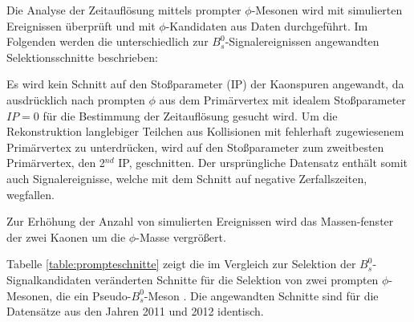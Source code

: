 \documentclass{article}
\begin{document}
Die Analyse der Zeitauflösung mittels prompter $\phi$-Mesonen wird mit simulierten Ereignissen überprüft und mit $\phi$-Kandidaten aus Daten durchgeführt. Im Folgenden werden die unterschiedlich zur $B_s^0$-Signalereignissen angewandten Selektionsschnitte beschrieben:

Es wird kein Schnitt auf den Stoßparameter (IP) der Kaonspuren angewandt, da ausdrücklich nach prompten $\phi$ aus dem Primärvertex mit idealem Stoßparameter $IP=0$ für die Bestimmung der Zeitauflösung gesucht wird. %
Um die Rekonstruktion langlebiger Teilchen aus Kollisionen mit fehlerhaft zugewiesenem Primärvertex zu unterdrücken, wird auf den Stoßparameter zum zweitbesten Primärvertex, den 2$^{nd}$ IP, geschnitten. Der ursprüngliche Datensatz enthält somit auch Signalereignisse, welche mit dem Schnitt auf negative Zerfallszeiten, wegfallen. 

Zur Erhöhung der Anzahl von simulierten Ereignissen wird das Massen-fenster der zwei Kaonen um die $\phi$-Masse vergrößert.

Tabelle \ref{table:prompteschnitte} zeigt die im Vergleich zur Selektion der $B_s^0$-Signalkandidaten veränderten Schnitte für die Selektion von zwei prompten $\phi$-Mesonen, die ein Pseudo-$B_s^0$-Meson . Die angewandten Schnitte sind für die Datensätze aus den Jahren 2011 und 2012 identisch. 
\end{document}
